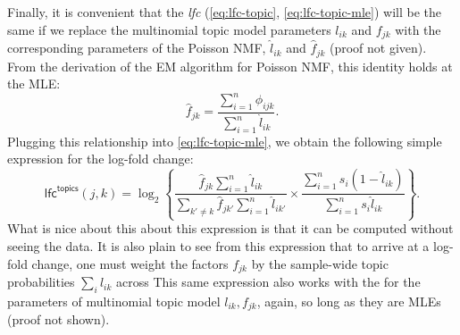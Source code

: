 \documentclass[final]{siamart171218}
\begin{document}
Finally, it is convenient that the {\em lfc} (\ref{eq:lfc-topic},
\ref{eq:lfc-topic-mle}) will be the same if we replace the multinomial
topic model parameters $l_{ik}$ and $f_{jk}$ with the corresponding
parameters of the Poisson NMF, $\hat{l}_{ik}$ and $\hat{f}_{jk}$
(proof not given). From the derivation of the EM algorithm for Poisson
NMF, this identity holds at the MLE:
\begin{equation*}
\hat{f}_{jk} = \frac{\sum_{i=1}^n \phi_{ijk}}{\sum_{i=1}^n \hat{l}_{ik}}.
\end{equation*}
Plugging this relationship into \eqref{eq:lfc-topic-mle}, we obtain
the following simple expression for the log-fold change:
\begin{equation}
\mathsf{lfc}^{\mathsf{topics}}(j,k) = 
\log_2 \left\{ 
\frac{\hat{f}_{jk} \sum_{i=1}^n \hat{l}_{ik}}
     {\sum_{k' \neq k} \hat{f}_{jk'} \sum_{i=1}^n \hat{l}_{ik'}} \times
\frac{\sum_{i=1}^n s_i (1 - \hat{l}_{ik})}
     {\sum_{i=1}^n s_i \hat{l}_{ik}} \right\}.
\label{eq:lfc-topic-mle-2}
\end{equation}
What is nice about this about this expression is that it can be
computed without seeing the data. It is also plain to see from this
expression that to arrive at a log-fold change, one must weight the
factors $f_{jk}$ by the sample-wide topic probabilities $\sum_i
l_{ik}$ across This same expression also works with the for the
parameters of multinomial topic model $l_{ik}, f_{jk}$, again, so long
as they are MLEs (proof not shown).



\end{document}
